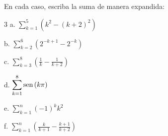 






\begin{ejer}{En cada caso, escriba la suma de manera expandida:}

{\small
\begin{multicols}{3}
a. $\displaystyle\sum_{k=1}^{5}\left( k^{2}-(k+2)^{2}\right)$


b. $\displaystyle\sum_{k=2}^{6}\left(2^{-k+1}-2^{-k}\right)$


c. $\displaystyle\sum_{k=3}^{8}\left( \frac{1}{k}-\frac{1}{k+2}\right)$


d. $\displaystyle\sum_{k=1}^{8}\text{\rm sen}\,(k\pi)$


e. $\displaystyle\sum_{k=1}^{n}(-1)^{k}k^{2}$


f. $\displaystyle\sum_{k=1}^{n}\left( \frac{k}{k+1}-\frac{k+1}{k+2} \right)$
\end{multicols}
}
\end{ejer}


